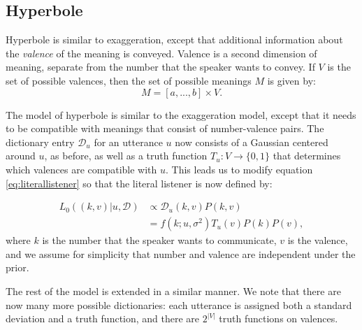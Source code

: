 \documentclass{article} %
\newcommand{\dictionary}{\ensuremath{\mathcal{D}}\xspace}
\begin{document}
\subsection{Hyperbole}

Hyperbole is similar to exaggeration, except that additional information about the \emph{valence} of the meaning is conveyed. Valence is a second dimension of meaning, separate from the number that the speaker wants to convey. If $V$ is the set of possible valences, then the set of possible meanings $M$ is given by:
\begin{equation}
M = [a,...,b] \times V.
\end{equation}

The model of hyperbole is similar to the exaggeration model, except that it needs to be compatible with meanings that consist of number-valence pairs. The dictionary entry $\dictionary_u$ for an utterance $u$ now consists of a Gaussian centered around $u$, as before, as well as a truth function $T_u:V\rightarrow \{0,1\}$ that determines which valences are compatible with $u$. This leads us to modify equation \ref{eq:literallistener} so that the literal listener is now defined by:

\begin{align}\label{eq:valenceliteral}
L_0((k,v) | u, \dictionary) &\propto \dictionary_u(k,v)P(k,v) \\
&=f(k;u,\sigma^2)T_u(v)P(k)P(v),
\end{align}
where $k$ is the number that the speaker wants to communicate, $v$ is the valence, and we assume for simplicity that number and valence are independent under the prior. 

The rest of the model is extended in a similar manner. We note that there are now many more possible dictionaries: each utterance is assigned both a standard deviation and a truth function, and there are $2^{|V|}$ truth functions on valences. 
\end{document}
